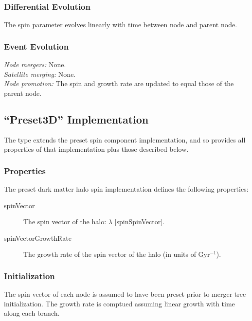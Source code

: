 \subsubsection{Differential Evolution}

The spin parameter evolves linearly with time between \gls{node} and parent node.

\subsubsection{Event Evolution}

\noindent\emph{Node mergers:} None.\\

\noindent\emph{Satellite merging:} None.\\

\noindent\emph{Node promotion:} The spin and growth rate are updated to equal those of the parent node.\\

\subsection{``Preset3D'' Implementation}

The type extends the {\normalfont \ttfamily preset} spin component implementation, and so provides all properties of that implementation plus those described below.

\subsubsection{Properties}

The preset dark matter halo spin implementation defines the following properties:
\begin{description}
 \item [{\normalfont \ttfamily spinVector}] The spin vector of the halo: $\lambda$ [{\normalfont \ttfamily spinSpinVector}].
 \item [{\normalfont \ttfamily spinVectorGrowthRate}] The growth rate of the spin vector of the halo (in units of Gyr$^{-1}$).
\end{description}

\subsubsection{Initialization}

The spin vector of each \gls{node} is assumed to have been preset prior to merger tree initialization. The growth rate is comptued assuming linear growth with time along each branch.

